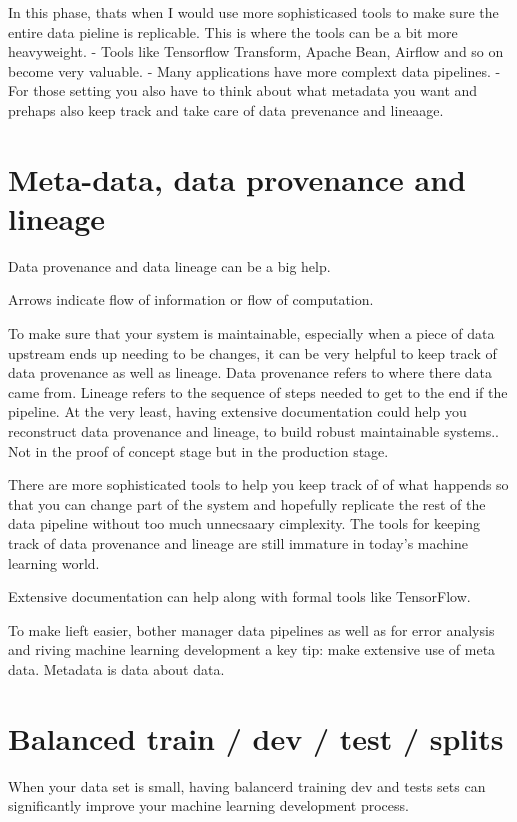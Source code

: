 In this phase, thats when I would use more sophisticased tools to make sure the entire data pieline is replicable.
This is where the tools can be a bit more heavyweight.
- Tools like Tensorflow Transform, Apache Bean, Airflow and so on become very valuable.
- Many applications have more complext data pipelines.
- For those setting you also have to think about what metadata you want and prehaps also keep track and take care of data prevenance and lineaage.

\section{Meta-data, data provenance and lineage}

Data provenance and data lineage can be a big help.


Arrows indicate flow of information or flow of computation.

To make sure that your system is maintainable, especially when a piece of data upstream ends up needing to be changes, it can be very helpful to keep track of data provenance as well as lineage.
Data provenance refers to where there data came from.
Lineage refers to the sequence of steps needed to get to the end if the pipeline.
At the very least, having extensive documentation could help you reconstruct data provenance and lineage, to build robust maintainable systems.. Not in the proof of concept stage but in the production stage.

There are more sophisticated tools to help you keep track of of what happends so that you can change part of the system and hopefully replicate the rest of the data pipeline without too much unnecsaary cimplexity.
The tools for keeping track of data provenance and lineage are still immature in today's machine learning world.

Extensive documentation can help along with formal tools like TensorFlow.

To make lieft easier, bother manager data pipelines as well as for error analysis and riving machine learning development a key tip: make extensive use of meta data.
Metadata is data about data.

\section{Balanced train / dev / test / splits}

When your data set is small, having balancerd training dev and tests sets can significantly improve your machine learning development process.

